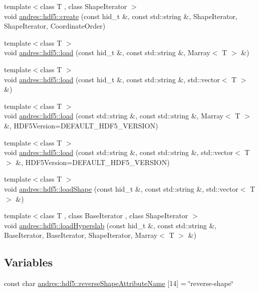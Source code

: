 \begin{DoxyCompactItemize}
\item 
{\footnotesize template$<$class T , class Shape\+Iterator $>$ }\\void \hyperlink{namespaceandres_1_1hdf5_ad266faeb7371428b1bf018d4ddfec60d}{andres\+::hdf5\+::create} (const hid\+\_\+t \&, const std\+::string \&, Shape\+Iterator, Shape\+Iterator, Coordinate\+Order)
\item 
{\footnotesize template$<$class T $>$ }\\void \hyperlink{namespaceandres_1_1hdf5_ad5975e294df6102c312f69cd69e43d60}{andres\+::hdf5\+::load} (const hid\+\_\+t \&, const std\+::string \&, Marray$<$ T $>$ \&)
\item 
{\footnotesize template$<$class T $>$ }\\void \hyperlink{namespaceandres_1_1hdf5_a2ada1d6f4dc33d14090bad2a90d4d1a6}{andres\+::hdf5\+::load} (const hid\+\_\+t \&, const std\+::string \&, std\+::vector$<$ T $>$ \&)
\item 
{\footnotesize template$<$class T $>$ }\\void \hyperlink{namespaceandres_1_1hdf5_aecef33e8f815adf3e28bb387e246ebc8}{andres\+::hdf5\+::load} (const std\+::string \&, const std\+::string \&, Marray$<$ T $>$ \&, H\+D\+F5\+Version=D\+E\+F\+A\+U\+L\+T\+\_\+\+H\+D\+F5\+\_\+\+V\+E\+R\+S\+I\+O\+N)
\item 
{\footnotesize template$<$class T $>$ }\\void \hyperlink{namespaceandres_1_1hdf5_a1efbca2cf84e0a2076dd02b98a96b65b}{andres\+::hdf5\+::load} (const std\+::string \&, const std\+::string \&, std\+::vector$<$ T $>$ \&, H\+D\+F5\+Version=D\+E\+F\+A\+U\+L\+T\+\_\+\+H\+D\+F5\+\_\+\+V\+E\+R\+S\+I\+O\+N)
\item 
{\footnotesize template$<$class T $>$ }\\void \hyperlink{namespaceandres_1_1hdf5_a9ce6bf731e79264846d466fd92eee01f}{andres\+::hdf5\+::load\+Shape} (const hid\+\_\+t \&, const std\+::string \&, std\+::vector$<$ T $>$ \&)
\item 
{\footnotesize template$<$class T , class Base\+Iterator , class Shape\+Iterator $>$ }\\void \hyperlink{namespaceandres_1_1hdf5_ab031fffd5429859c7f914d8f883a6224}{andres\+::hdf5\+::load\+Hyperslab} (const hid\+\_\+t \&, const std\+::string \&, Base\+Iterator, Base\+Iterator, Shape\+Iterator, Marray$<$ T $>$ \&)
\end{DoxyCompactItemize}
\subsection*{Variables}
\begin{DoxyCompactItemize}
\item 
const char \hyperlink{namespaceandres_1_1hdf5_acf79cfe1ea0769086a46970fd58188a7}{andres\+::hdf5\+::reverse\+Shape\+Attribute\+Name} \mbox{[}14\mbox{]} = \char`\"{}reverse-\/shape\char`\"{}
\end{DoxyCompactItemize}


